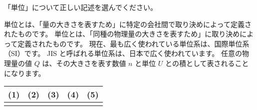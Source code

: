 \documentclass[uplatex,dvipdfmx,a4paper,11pt]{jsarticle}
\begin{document}
\begin{qlist}
\begin{qlist2}
    \end{qlist2}
    \vspace{3mm}
	\qitem 「単位」について正しい記述を選んでください。
		\begin{qlist2}
			\qitem 単位とは、「量の大きさを表すため」に特定の会社間で取り決めによって定義されたものです。
			\qitem 単位とは、「同種の物理量の大きさを表すため」に取り決めによって定義されたものです。
			\qitem 現在、最も広く使われている単位系は、国際単位系（SI）です。
			\qitem JIS と呼ばれる単位系は、日本で広く使われています。
			\qitem 任意の物理量の値 $Q$ は、その大きさを表す数値 $n$ と単位 $U$ との積として表されることになります。
		\end{qlist2}
\end{qlist}

\begin{table}[htb]
  \begin{center} 
    \begin{tabular}{|p{}|p{}|p{}|p{}|p{}|} \hline
      (1) & (2) & (3) & (4) & (5)\\ \hline \hline
        &  & & &  \\ \hline		
    \end{tabular}
  \end{center}
\end{table}
\end{document}
